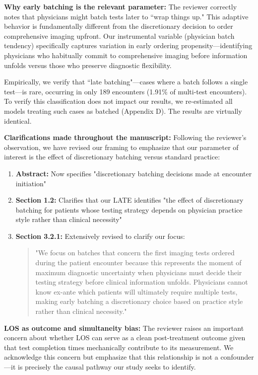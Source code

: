 \documentclass[11pt]{article}
\newcommand{\1}{\hbox{\rm 1\kern-.35em 1}}
\begin{document}
\textbf{Why early batching is the relevant parameter:} The reviewer correctly notes that physicians might batch tests later to ``wrap things up." This adaptive behavior is fundamentally different from the discretionary decision to order comprehensive imaging upfront. Our instrumental variable (physician batch tendency) specifically captures variation in early ordering propensity—identifying physicians who habitually commit to comprehensive imaging before information unfolds versus those who preserve diagnostic flexibility.

Empirically, we verify that ``late batching"—cases where a batch follows a single test—is rare, occurring in only 189 encounters (1.91\% of multi-test encounters). To verify this classification does not impact our results, we re-estimated all models treating such cases as batched (Appendix D). The results are virtually identical.

\textbf{Clarifications made throughout the manuscript:} Following the reviewer's observation, we have revised our framing to emphasize that our parameter of interest is the effect of discretionary batching versus standard practice:

\begin{enumerate}
\item \textbf{Abstract:} Now specifies "discretionary batching decisions made at encounter initiation"

\item \textbf{Section 1.2:} Clarifies that our LATE identifies "the effect of discretionary batching for patients whose testing strategy depends on physician practice style rather than clinical necessity"

\item \textbf{Section 3.2.1:} Extensively revised to clarify our focus:
\begin{quote}
"We focus on batches that concern the first imaging tests ordered during the patient encounter because this represents the moment of maximum diagnostic uncertainty when physicians must decide their testing strategy before clinical information unfolds. Physicians cannot know ex-ante which patients will ultimately require multiple tests, making early batching a discretionary choice based on practice style rather than clinical necessity."
\end{quote}
\end{enumerate}

\textbf{LOS as outcome and simultaneity bias:} The reviewer raises an important concern about whether LOS can serve as a clean post-treatment outcome given that test completion times mechanically contribute to its measurement. We acknowledge this concern but emphasize that this relationship is not a confounder—it is precisely the causal pathway our study seeks to identify.
\end{document}
